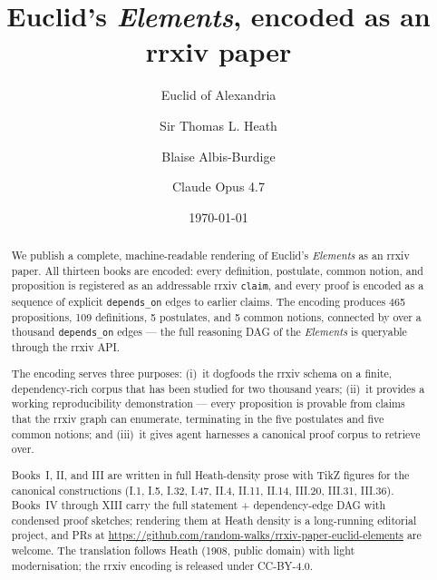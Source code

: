 \documentclass{rrxiv}
\title{Euclid's \emph{Elements}, encoded as an rrxiv paper}
\author{Euclid of Alexandria \and Sir Thomas L. Heath \and Blaise Albis-Burdige \and Claude Opus 4.7}
\date{\today}
\begin{document}
\maketitle

\begin{abstract}
We publish a complete, machine-readable rendering of Euclid's
\emph{Elements} as an rrxiv paper. All thirteen books are encoded:
every definition, postulate, common notion, and proposition is
registered as an addressable rrxiv \texttt{claim}, and every proof
is encoded as a sequence of explicit \texttt{depends\_on} edges to
earlier claims. The encoding produces 465 propositions, 109
definitions, 5 postulates, and 5 common notions, connected by over a
thousand \texttt{depends\_on} edges --- the full reasoning DAG of
the \emph{Elements} is queryable through the rrxiv API.

The encoding serves three purposes: (i)~it dogfoods the rrxiv schema
on a finite, dependency-rich corpus that has been studied for two
thousand years; (ii)~it provides a working reproducibility
demonstration --- every proposition is provable from claims that the
rrxiv graph can enumerate, terminating in the five postulates and
five common notions; and (iii)~it gives agent harnesses a canonical
proof corpus to retrieve over.

Books~I, II, and III are written in full Heath-density prose with
TikZ figures for the canonical constructions (I.1, I.5, I.32, I.47,
II.4, II.11, II.14, III.20, III.31, III.36). Books~IV through XIII
carry the full statement + dependency-edge DAG with condensed proof
sketches; rendering them at Heath density is a long-running editorial
project, and PRs at \url{https://github.com/random-walks/rrxiv-paper-euclid-elements}
are welcome. The translation follows Heath (1908, public domain) with
light modernisation; the rrxiv encoding is released under CC-BY-4.0.
\end{abstract}


















\end{document}
